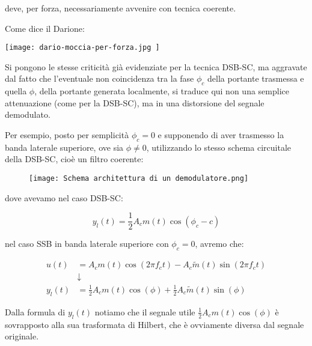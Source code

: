deve, per forza, necessariamente avvenire con tecnica coerente. \newline 

\begin{tcolorbox}
    Come dice il Darione: \newline

    \texttt{[image: dario-moccia-per-forza.jpg ]}
\end{tcolorbox}

Si pongono le stesse criticità già evidenziate per la tecnica DSB-SC, 
ma aggravate dal fatto che l'eventuale non coincidenza tra la fase $\phi_c$ della portante trasmessa e quella $\phi$, 
della portante generata localmente, si  traduce qui non una semplice attenuazione (come per la DSB-SC), 
ma in una distorsione del segnale demodulato. \newline 

Per esempio, posto per semplicità $\phi_c = 0$ e supponendo di aver trasmesso la banda laterale superiore, ove sia $\phi \neq 0$, 
utilizzando lo stesso schema circuitale della DSB-SC, cioè un filtro coerente: 

\begin{figure}[h]
    \centering
    \texttt{[image: Schema architettura di un demodulatore.png]}
\end{figure} 

dove avevamo nel caso DSB-SC: 

{
    \Large 
    \begin{equation}
        y_l (t)
        = 
        \frac{1}{2} A_c m(t) \cos(\phi_c - c)
    \end{equation}
}   

nel caso SSB in banda laterale superiore con $\phi_c = 0$, 
avremo che: 

{
    \Large 
    \begin{equation}
        \begin{split}
        u(t)
        &=
        A_c m(t) \cos(2 \pi f_c t)
        -
        A_c \tilde{m}(t) \sin(2 \pi f_c t) 
        \\
        &\downarrow
        \\
        y_l (t)
        &=
        \frac{1}{2} A_c m(t) \cos(\phi)
        + 
        \frac{1}{2} A_c \tilde{m}(t) \sin(\phi)
        \end{split}
    \end{equation}
}

Dalla formula di $y_l (t)$ notiamo che il segnale utile $\frac{1}{2} A_c m(t) \cos(\phi)$ 
è sovrapposto alla sua trasformata di Hilbert, che è ovviamente diversa dal segnale originale. \newline 

